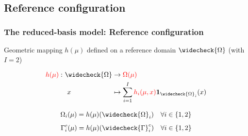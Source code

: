 \documentclass[a4paper,10pt]{beamer}
\newcommand\red[1]{\textcolor{red} {#1} }
\begin{document}
\subsection{Reference configuration}
\begin{frame}\frametitle{The reduced-basis model: Reference configuration}
Geometric mapping $h(\mu)$ defined on a reference domain $\widecheck{\Omega}$ (with $I=2$)
\begin{center}
\begin{tcolorbox}[colback=blue!5,colframe=black!50!cyan,width = .5\linewidth]
\vspace{-.4cm}
$$
\begin{alignedat}{2}
\red{h(\mu)}:\ &\widecheck{\Omega}&&\rightarrow\red{\Omega(\mu)}\\
&\ x &&\mapsto \sum_{i=1}^I \red{h_i(\mu,x)}\mathbf 1_{\widecheck{\Omega}_i}(x)
\end{alignedat}
$$
\vspace{-.4cm}
\end{tcolorbox}
\end{center}
\pause
\vspace{-.1cm}
\begin{equation*}
\Omega_i(\mu) = h(\mu)(\widecheck{\Omega}_i)
\quad\forall i\in\{1,2\}
\end{equation*}
\begin{equation*}
\Gamma_i^c(\mu) = h(\mu)(\widecheck{\Gamma}^c_i)
\quad\forall i\in\{1,2\}
\end{equation*}\vspace{-.8cm}


\end{frame}
\end{document}
